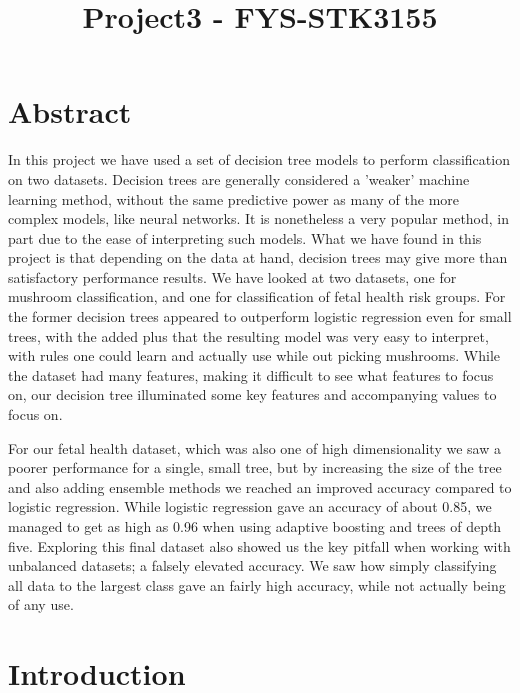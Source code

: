 \documentclass[11pt]{article}
\title{Project3 - FYS-STK3155}
\begin{document}
    
    \maketitle
    
    

    
    \hypertarget{abstract}{%
\section{Abstract}\label{abstract}}

    In this project we have used a set of decision tree models to perform classification on two datasets. Decision trees are generally considered a 'weaker' machine learning method, without the same predictive power as many of the more complex models, like neural networks. It is nonetheless a very popular method, in part due to the ease of interpreting such models. What we have found in this project is that depending on the data at hand, decision trees may give more than satisfactory performance results. We have looked at two datasets, one for mushroom classification, and one for classification of fetal health risk groups. For the former decision trees appeared to outperform logistic regression even for small trees, with the added plus that the resulting model was very easy to interpret, with rules one could learn and actually use while out picking mushrooms. While the dataset had many features, making it difficult to see what features to focus on, our decision tree illuminated some key features and accompanying values to focus on.
    
    For our fetal health dataset, which was also one of high dimensionality we saw a poorer performance for a single, small tree, but by increasing the size of the tree and also adding ensemble methods we reached an improved accuracy compared to logistic regression. While logistic regression gave an accuracy of about 0.85, we managed to get as high as 0.96 when using adaptive boosting and trees of depth five. Exploring this final dataset also showed us the key pitfall when working with unbalanced datasets; a falsely elevated accuracy. We saw how simply classifying all data to the largest class gave an fairly high accuracy, while not actually being of any use. 

    \hypertarget{introduction}{%
\section{Introduction}\label{introduction}}
\end{document}
